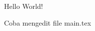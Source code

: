 \documentclass{article}
\begin{document}
  
  Hello World!
  
  Coba mengedit file main.tex  
  
\end{document}
